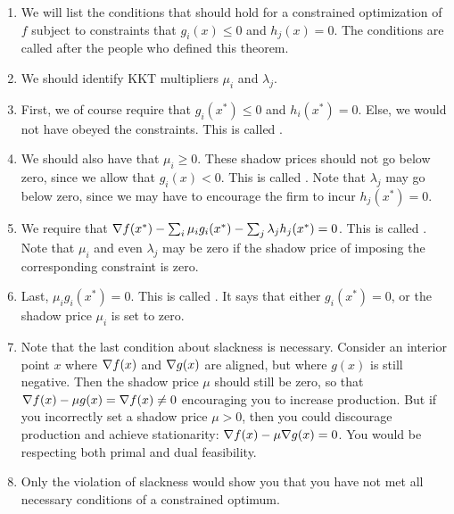 \documentclass[11pt, oneside]{amsart}
\begin{document}
\begin{enumerate}
  \item We will list the conditions that should hold for a constrained
  optimization of $f$ subject to constraints that $g_i(x) \leq 0$ and
  $h_j(x) = 0$. The conditions are called  after
  the people who defined this theorem.

  \item We should identify KKT multipliers $\mu_i$ and $\lambda_j$.

  \item First, we of course require that $g_i(x^*) \leq 0$ and $h_i(x^*)
  = 0$. Else, we would not have obeyed the constraints. This is called
  .

  \item We should also have that $\mu_i \geq 0$. These shadow prices
  should not go below zero, since we allow that $g_i(x) < 0$. This is
  called . Note that $\lambda_j$ may go below
  zero, since we may have to encourage the firm to incur $h_j(x^*) = 0$.

  \item We require that $\nabla f(x^*) - \sum_i \mu_i g_i(x^*) - \sum_j
  \lambda_j h_j(x^*) = 0$. This is called . Note
  that $\mu_i$ and even $\lambda_j$ may be zero if the shadow price of
  imposing the corresponding constraint is zero.

  \item Last, $\mu_i g_i(x^*) = 0$. This is called .
  It says that either $g_i(x^*) = 0$, or the shadow price $\mu_i$ is set
  to zero.

  \item Note that the last condition about slackness is necessary.
  Consider an interior point $x$ where $\nabla f(x)$ and $\nabla g(x)$ are
  aligned, but where $g(x)$ is still negative. Then the shadow price
  $\mu$ should still be zero, so that $\nabla f(x) - \mu g(x) = \nabla
  f(x) \ne 0$ encouraging you to increase production. But if you
  incorrectly set a shadow price $\mu > 0$, then you could discourage
  production and achieve stationarity: $\nabla f(x) - \mu \nabla g(x) =
  0$. You would be respecting both primal and dual feasibility.

  \item Only the violation of slackness would show you that you have not
  met all necessary conditions of a constrained optimum.
\end{enumerate}
\end{document}
